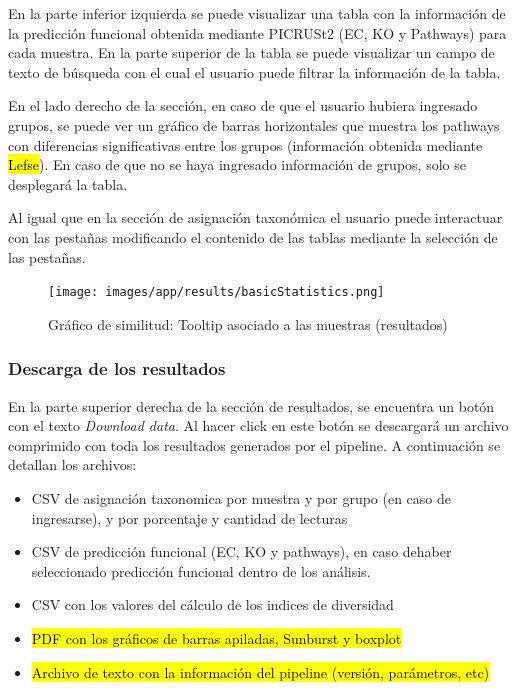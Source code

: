 En la parte inferior izquierda se puede visualizar una tabla con la información de la predicción funcional obtenida mediante PICRUSt2 (EC, KO y Pathways) para cada muestra. 
En la parte superior de la tabla se puede visualizar un campo de texto de búsqueda con el cual el usuario puede filtrar la información de la tabla.

En el lado derecho de la sección, en caso de que el usuario hubiera ingresado grupos, se puede ver un gráfico de barras horizontales que muestra los pathways con diferencias significativas entre los grupos (información obtenida mediante \hl{Lefse}). 
En caso de que no se haya ingresado información de grupos, solo se desplegará la tabla.

Al igual que en la sección de asignación taxonómica el usuario puede interactuar con las pestañas modificando el contenido de las tablas mediante la selección de las pestañas.


\begin{figure}[H]
    \texttt{[image: images/app/results/basicStatistics.png]}

    \caption{Gráfico de similitud: Tooltip asociado a las muestras (resultados)}
    \label{fig:app-results-functional}
\end{figure}
\subsubsection{Descarga de los resultados}
En la parte superior derecha de la sección de resultados, se encuentra un botón con el texto \textit{Download data}. 
Al hacer click en este botón se descargará un archivo comprimido con toda los resultados generados por el pipeline.
A continuación se detallan los archivos:
\begin{itemize}
    \item CSV de asignación taxonomica por muestra y por grupo (en caso de ingresarse), y por porcentaje y cantidad de lecturas
    \item CSV de predicción funcional (EC, KO y pathways), en caso dehaber seleccionado predicción funcional dentro de los análisis.
    \item CSV con los valores del cálculo de los indices de diversidad
    \item \hl{PDF con los gráficos de barras apiladas, Sunburst y boxplot}
    \item \hl{Archivo de texto con la información del pipeline (versión, parámetros, etc)}
\end{itemize}


